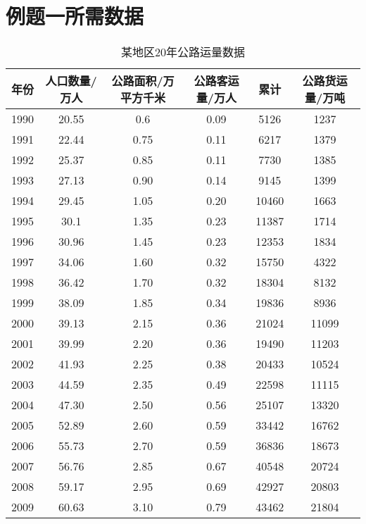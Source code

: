 \documentclass[bwprint]{cumcmthesis}
\begin{document}
\section{例题一所需数据}
\label{append}
\begin{table}[H]
	\centering
	\label{tbl:data}
	\caption{某地区20年公路运量数据}
	\begin{tabular}{|c|c|c|c|c|c|}
		\hline		
		年份 & 人口数量/万人 & 公路面积/万平方千米 & 公路客运量/万人& 累计 & 公路货运量/万吨\\ \hline
		1990 & 20.55 & 0.6 & 0.09 & 5126 & 1237\\ \hline
		1991  & 22.44  & 0.75 &  0.11 &  6217  & 1379\\ \hline
		1992 &  25.37  & 0.85 &  0.11 &  7730 &  1385\\ \hline
		1993 &  27.13 &  0.90 &  0.14 &  9145 &  1399\\ \hline
		1994 &  29.45 &  1.05 &  0.20 &  10460 &  1663\\ \hline
		1995 &  30.1  & 1.35 &  0.23  & 11387 &  1714\\ \hline
		1996 &  30.96 &  1.45 &  0.23 &  12353 &  1834\\ \hline
		1997  & 34.06 &  1.60 &  0.32 &  15750 &  4322\\ \hline
		1998  & 36.42 &  1.70 &  0.32 & 18304 &  8132\\ \hline
		1999  & 38.09 &  1.85 &  0.34 &  19836 &  8936\\ \hline
		2000 &  39.13 &  2.15 &  0.36 &  21024 &  11099\\ \hline
		2001  & 39.99 &  2.20 &  0.36 &  19490 &  11203\\ \hline
		2002 &  41.93 &  2.25 &  0.38 &  20433 &  10524\\ \hline
		2003 &  44.59 &  2.35 &  0.49 &  22598 &  11115\\ \hline
		2004  & 47.30 &  2.50 &  0.56 &  25107 &  13320\\ \hline
		2005  & 52.89 &  2.60 &  0.59 &  33442  & 16762\\ \hline
		2006 &  55.73 &  2.70 &  0.59 &  36836 & 18673\\ \hline
		2007  & 56.76 &  2.85 &  0.67 &  40548 &  20724\\ \hline
		2008  & 59.17 &  2.95 &  0.69 &  42927 &  20803\\ \hline
		2009 &  60.63 &  3.10 &  0.79 &  43462  & 21804\\ \hline	
	\end{tabular}
\end{table}
\end{document}
